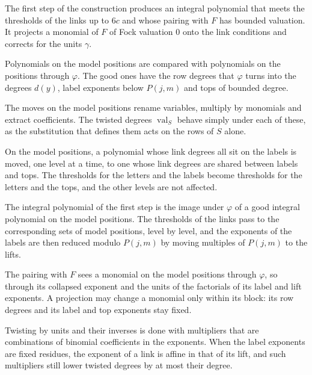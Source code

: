 The first step of the construction produces an integral polynomial that meets the thresholds of the links up to $6c$
and whose pairing with $F$ has bounded valuation. It projects a monomial of $F$ of Fock valuation $0$ onto the link
conditions and corrects for the units $\gamma$.

Polynomials on the model positions are compared with polynomials on the positions through $\varphi$. The good ones
have the row degrees that $\varphi$ turns into the degrees $d(y)$, label exponents below $P(j,m)$ and tops of bounded
degree.

The moves on the model positions rename variables, multiply by monomials and extract coefficients. The twisted degrees
$\operatorname{val}_S$ behave simply under each of these, as the substitution that defines them acts on the rows of $S$
alone.

On the model positions, a polynomial whose link degrees all sit on the labels is moved, one level at a time, to one
whose link degrees are shared between labels and tops. The thresholds for the letters and the labels become thresholds
for the letters and the tops, and the other levels are not affected.

The integral polynomial of the first step is the image under $\varphi$ of a good integral polynomial on the model
positions. The thresholds of the links pass to the corresponding sets of model positions, level by level, and the
exponents of the labels are then reduced modulo $P(j,m)$ by moving multiples of $P(j,m)$ to the lifts.

The pairing with $F$ sees a monomial on the model positions through $\varphi$, so through its collapsed exponent and the
units of the factorials of its label and lift exponents. A projection may change a monomial only within its block: its
row degrees and its label and top exponents stay fixed.

Twisting by units and their inverses is done with multipliers that are combinations of binomial coefficients in the
exponents. When the label exponents are fixed residues, the exponent of a link is affine in that of its lift, and such
multipliers still lower twisted degrees by at most their degree.

